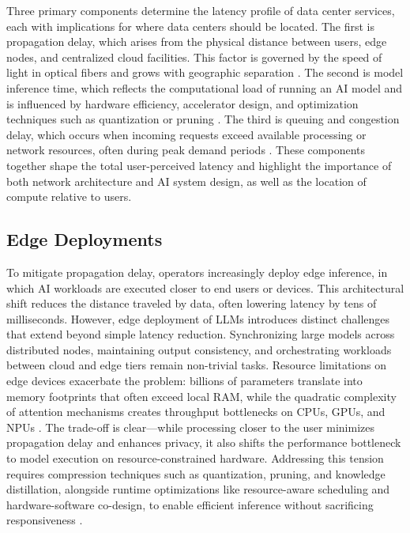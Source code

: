 \documentclass[conference]{IEEEtran}
\begin{document}
Three primary components determine the latency profile of data center services, each with implications for where data centers should be located. The first is propagation delay, which arises from the physical distance between users, edge nodes, and centralized cloud facilities. This factor is governed by the speed of light in optical fibers and grows with geographic separation \cite{Bozkurt2018}. The second is model inference time, which reflects the computational load of running an AI model and is influenced by hardware efficiency, accelerator design, and optimization techniques such as quantization or pruning \cite{Cruzes2026}. The third is queuing and congestion delay, which occurs when incoming requests exceed available processing or network resources, often during peak demand periods \cite{Dong2023}. These components together shape the total user-perceived latency and highlight the importance of both network architecture and AI system design, as well as the location of compute relative to users.

\subsection{Edge Deployments}

To mitigate propagation delay, operators increasingly deploy edge inference, in which AI workloads are executed closer to end users or devices. This architectural shift reduces the distance traveled by data, often lowering latency by tens of milliseconds. However, edge deployment of LLMs introduces distinct challenges that extend beyond simple latency reduction. Synchronizing large models across distributed nodes, maintaining output consistency, and orchestrating workloads between cloud and edge tiers remain non-trivial tasks. Resource limitations on edge devices exacerbate the problem: billions of parameters translate into memory footprints that often exceed local RAM, while the quadratic complexity of attention mechanisms creates throughput bottlenecks on CPUs, GPUs, and NPUs \cite{Cruzes2026}. The trade-off is clear---while processing closer to the user minimizes propagation delay and enhances privacy, it also shifts the performance bottleneck to model execution on resource-constrained hardware. Addressing this tension requires compression techniques such as quantization, pruning, and knowledge distillation, alongside runtime optimizations like resource-aware scheduling and hardware-software co-design, to enable efficient inference without sacrificing responsiveness \cite{Zheng2025}.
\end{document}
